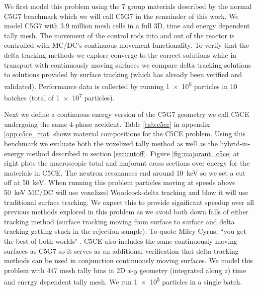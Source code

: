 We first model this problem using the 7 group materials described by the normal C5G7 benchmark \cite{jia_hou_oecdnea_2017} which we will call C5G7 in the remainder of this work.
We model C5G7 with \num{3.9} million mesh cells in a full 3D, time and energy dependent tally mesh.
The movement of the control rods into and out of the reactor is controlled with MC/DC's continuous movement functionality.
To verify that the delta tracking methods we explore converge to the correct solutions while in transport with continuously moving surfaces we compare delta tracking solutions to solutions provided by surface tracking (which has already been verified and validated).
Performance data is collected by running \num{1e6} particles in \num{10} batches (total of \num{1e7} particles).

Next we define a continuous energy version of the C5G7 geometry we call C5CE undergoing the same 4-phase accident.
Table \ref{tab:c5ce} in appendix \ref{app:c5ce_mat} shows material compositions for the C5CE problem.
Using this benchmark we evaluate both the voxelized tally method as well as the hybrid-in-energy method described in section \ref{sec:cutoff}.
Figure \ref{fig:majorant_c5ce} at right plots the macroscopic total and majorant cross sections over energy for the materials in C5CE.
The neutron resonances end around \SI{10}{\kilo\electronvolt} so we set a cut off at \SI{50}{\kilo\electronvolt}.
When running this problem particles moving at speeds above \SI{50}{\kilo\electronvolt} MC/DC will use voxelized Woodcock-delta tracking and blow it will use traditional surface tracking.
We expect this to provide significant speedup over all previous methods explored in this problem as we avoid both down falls of either tracking method (surface tracking moving from surface to surface and delta tracking getting stuck in the rejection sample). 
To quote Miley Cyrus, ``you get the best of both worlds" \cite{cyrus_best_2005}.
C5CE also includes the same continuously moving surfaces as C5G7 so it serves as an additional verification that delta tracking methods can be used in conjunction continuously moving surfaces.
We model this problem with \num{447} mesh tally bins in 2D $x$-$y$ geometry (integrated along $z$) time and energy dependent tally mesh.
We run \num{1e5} particles in a single batch.

